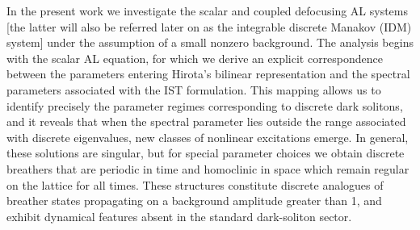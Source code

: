 \documentclass{article}
\begin{document}
In the present work we investigate the scalar and coupled defocusing AL systems [the latter will also be referred later on as the integrable discrete Manakov (IDM) system] under the assumption of a small nonzero background. The analysis begins with the scalar AL equation, for which we derive an explicit correspondence between the parameters entering Hirota’s bilinear representation and the spectral parameters associated with the IST formulation. This mapping allows us to identify precisely the parameter regimes corresponding to discrete dark solitons, and it reveals that when the spectral parameter lies outside the range associated with discrete eigenvalues, new classes of nonlinear excitations emerge. In general, these solutions are singular, but for special parameter choices we obtain discrete breathers that are periodic in time and homoclinic in space which remain regular on the lattice for all times. These structures constitute discrete analogues of breather states propagating on a background amplitude greater than 1, and exhibit dynamical features absent in the standard dark-soliton sector.
\end{document}
